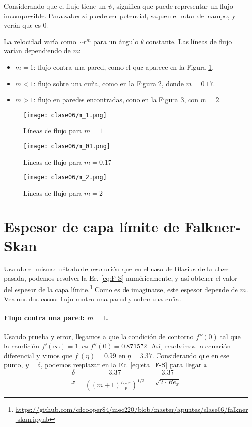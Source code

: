 Considerando que el flujo tiene un $\psi$, significa que puede representar un flujo incompresible.
Para saber si puede ser potencial, saquen el rotor del campo, y verán que es $0$.

La velocidad varía como $\sim r^m$ para un ángulo $\theta$ constante. 
Las líneas de flujo varían dependiendo de $m$:
%
\begin{itemize}
\item $m=1$: flujo contra una pared, como el que aparece en la Figura \ref{fig:m_1}.
\item $m<1$: flujo sobre una cuña, como en la Figura \ref{fig:m_01}, donde $m=0.17$.
\item $m>1$: flujo en paredes encontradas, cono en la Figura \ref{fig:m_2}, con $m=2$.
\end{itemize}

\begin{figure}
\centering
\texttt{[image: clase06/m\_1.png]}
\caption{Líneas de flujo para $m=1$}
\label{fig:m_1}
\end{figure}
%
\begin{figure}
\centering
\texttt{[image: clase06/m\_01.png]}
\caption{Líneas de flujo para $m=0.17$}
\label{fig:m_01}
\end{figure}
%
\begin{figure}
\centering
\texttt{[image: clase06/m\_2.png]}
\caption{Líneas de flujo para $m=2$}
\label{fig:m_2}
\end{figure}

\section*{Espesor de capa límite de Falkner-Skan}
Usando el mismo método de resolución que en el caso de Blasius de la clase pasada, podemos resolver la Ec. \eqref{eq:F-S} numéricamente, y así obtener el valor del espesor de la capa límite.\footnote{\url{https://github.com/cdcooper84/mec220/blob/master/apuntes/clase06/falkner-skan.ipynb}}
Como es de imaginarse, este espesor depende de $m$.
Veamos dos casos: flujo contra una pared y sobre una cuña.

\paragraph*{Flujo contra una pared: $m=1$.}
Usando prueba y error, llegamos a que la condición de contorno $f''(0)$ tal que la condición $f'(\infty)=1$, es $f''(0)=0.871572$.
Así, resolvimos la ecuación diferencial y vimos que $f'(\eta) = 0.99$ en $\eta=3.37$. 
Considerando que en ese punto, $y=\delta$, podemos reeplazar en la Ec. \eqref{eq:eta_F-S} para llegar a
%
\begin{equation}
\frac{\delta}{x}=\frac{3.37}{\left((m+1)\frac{U_\infty x}{\nu}\right)^{1/2}} = \frac{3.37}{\sqrt{2\cdot Re_x}} 
\end{equation}

